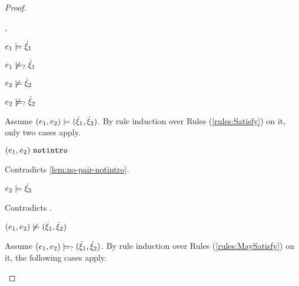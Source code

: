 \begin{proof}
\begin{byCases}
\begin{byCases}
\begin{byCases}
        \item[\csatisfy{e_1}{\hxi_1},\cnotsatisfyormay{e_2}{\hxi_2}]
            \begin{pfsteps*}
            \item $e_1 \models \dot{\xi}_1$  
            \item $e_1 \not\models_{?} \dot{\xi}_1$  
            \item $e_2 \not\models \dot{\xi}_2$  
            \item $e_2 \not\models_{?} \dot{\xi}_2$  
            \end{pfsteps*}
            Assume $(e_1 , e_2) \models (\dot{\xi}_1 , \dot{\xi}_2)$. By rule induction over Rules (\ref{rules:Satisfy}) on it, only two cases apply. 
           \begin{byCases}
            \item[\text{(\ref{rule:CSNotIntroPair})}]
                \begin{pfsteps*}
                \item $(e_1 , e_2) ~\mathtt{notintro}$ 
                \end{pfsteps*}
                Contradicts \autoref{lem:no-pair-notintro}.
            \item[\text{(\ref{rule:CSPair})}]
                \begin{pfsteps*}
                \item $e_2 \models \dot{\xi}_2$ 
                \end{pfsteps*}
                Contradicts .
            \end{byCases}
            \begin{pfsteps*}
            \item $(e_1 , e_2) \not\models (\dot{\xi}_1 , \dot{\xi}_2)$  
            \end{pfsteps*}
            Assume $(e_1 , e_2) \models_{?} (\dot{\xi}_1 , \dot{\xi}_2)$. By rule induction over Rules (\ref{rules:MaySatisfy}) on it, the following cases apply.
            \begin{byCases}
            \item[\text{(\ref{rule:CMSNotIntro})}]

\end{byCases}
\end{byCases}
\end{byCases}
\end{byCases}
\end{proof}
